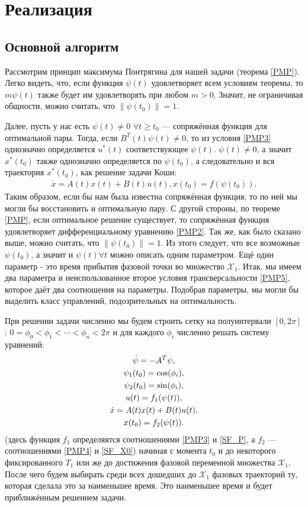\documentclass[11pt]{article}
\newcommand{\norm}[1]{\left\lVert #1 \right\lVert}
\begin{document}
\section{Реализация}
\subsection{Основной алгоритм}
Рассмотрим принцип максимума Понтрягина для нашей задачи (теорема \ref{PMP}). Легко видеть, что, если функция $\psi(t)$ удовлетворяет всем условиям теоремы, то $m\psi(t)$ также будет им удовлетворять при любом $m > 0$. Значит, не ограничивая общности, можно считать, что $\norm{\psi(t_0)} = 1$.

Далее, пусть у нас есть $\psi(t) \neq 0$ $\forall t \geqslant t_0$ --- сопряжённая функция для оптимальной пары. Тогда, если $B^T(t)\psi(t) \neq 0$, то из условия \eqref{PMP3} однозначно определяется $u^*(t)$ соответствующее $\psi(t)$. $\psi(t) \neq 0$, а значит $x^*(t_0)$ также однозначно определяется по $\psi(t_0)$, а следовательно и вся траектория $x^*(t_0)$, как решение задачи Коши:
\begin{gather}
\dot{x} = A(t)x(t) + B(t)u(t),
x(t_0) = f(\psi(t_0)).
\end{gather}
Таким образом, если бы нам была известна сопряжённая функция, то по ней мы могли бы восстановить и оптимальную пару. С другой стороны, по теореме \ref{PMP}, если оптимальное решение существует, то сопряжённая функция удовлетворяет дифференциальному уравнению \eqref{PMP2}. Так же, как было сказано выше, можно считать, что $\norm{\psi(t_0)} = 1$. Из этого следует, что все возможные $\psi(t_0)$, а значит и $\psi(t) \forall t$ можно описать одним параметром. Ещё один параметр - это время прибытия фазовой точки во множество $\mathcal{X}_1$. Итак, мы имеем два параметра и неиспользованное второе условия трансверсальности \eqref{PMP5}, которое даёт два соотношения на параметры. Подобрав параметры, мы могли бы выделить класс управлений, подозрительных на оптимальность.

При решении задачи численно мы будем строить сетку на полуинтервали $\left[ 0, 2\pi \right]$: $0 = \phi_0 < \phi_1 < \dotsb < \phi_n < 2\pi$ и для каждого $\phi_i$ численно решать систему уравнений:
\begin{gather}
\dot{\psi} = -A^T\psi, \notag \\
\psi_1(t_0) = \cos(\phi_i), \notag \\
\psi_2(t_0) = \sin(\phi_i), \notag \\
u(t) = f_1(\psi(t)), \notag \\
\dot{x} = A(t)x(t) + B(t)u(t), \notag \\
x(t_0) = f_2(\psi(t)). \notag
\end{gather}
(здесь функция $f_1$ определяятся соотношениями \eqref{PMP3} и \eqref{SF_P}, а $f_2$ --- соотношениями \eqref{PMP4} и \eqref{SF_X0}) начиная с момента $t_0$ и до некоторого фиксированного $T_1$ или же до достижения фазовой переменной множества $\mathcal{X}_1$. После чего будем выбирать среди всех дошедших до $\mathcal{X}_1$ фазовых траекторий ту, которая сделала это за наименьшее время. Это наименьшее время и будет приближённым решением задачи.
\end{document}
